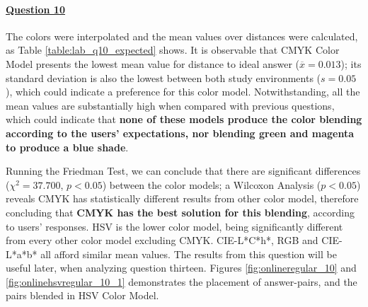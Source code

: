 \paragraph{\ul{Question 10}}
%
The colors were interpolated and the mean values over distances were calculated, as Table \ref{table:lab_q10_expected} shows. It is observable that CMYK Color Model presents
the lowest mean value for distance to ideal answer ($\overline{x} = 0.013$); its standard deviation is also the lowest between both study environments ($s = 0.05$), which could indicate a preference
for this color model. Notwithstanding, all the mean values are substantially high when compared with previous questions, which could indicate that \textbf{none of these models produce the color blending according
to the users' expectations, nor blending green and magenta to produce a blue shade}. \par
%
Running the Friedman Test, we can conclude that there are significant differences ($\chi^2 = 37.700$, $p < 0.05$) between the color models; a Wilcoxon Analysis ($p < 0.05$) reveals
CMYK has statistically different results from other color model, therefore concluding that \textbf{CMYK has the best solution for this blending}, according to
users' responses. HSV is the lower color model, being significantly different from every other color model excluding CMYK. CIE-L*C*h*, RGB and CIE-L*a*b* all afford similar mean values.
The results from this question will be useful later, when analyzing question thirteen. Figures \ref{fig:onlineregular_10} and \ref{fig:onlinehsvregular_10_1} demonstrates the placement of answer-pairs, and the pairs blended in HSV Color Model.
%

